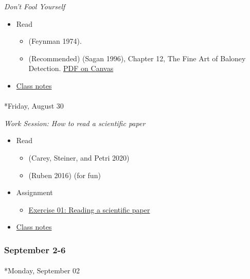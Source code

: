 \documentclass[
  letterpaper,
  DIV=11,
  numbers=noendperiod]{scrartcl}
\makeatletter
\let\oldparagraph\paragraph
\renewcommand{\paragraph}{
    \@ifstar
      \xxxParagraphStar
      \xxxParagraphNoStar
  }
\newcommand{\xxxParagraphStar}[1]{\oldparagraph*{#1}\mbox{}}
\newcommand{\xxxParagraphNoStar}[1]{\oldparagraph{#1}\mbox{}}
\providecommand{\tightlist}{%
  \setlength{\itemsep}{0pt}\setlength{\parskip}{0pt}}\usepackage{longtable,booktabs,array}
\makeatother
\begin{document}
\emph{Don't Fool Yourself}

\begin{itemize}
\tightlist
\item
  Read

  \begin{itemize}
  \tightlist
  \item
    (Feynman 1974).
  \item
    (Recommended) (Sagan 1996), Chapter 12, The Fine Art of Baloney
    Detection.
    \href{https://psu.instructure.com/courses/2350148/files/folder/readings?preview=165170710}{PDF
    on Canvas}
  \end{itemize}
\item
  \href{notes/wk01-2024-08-28-no-foolin.qmd}{Class notes}
\end{itemize}

\paragraph*{Friday, August 30}\label{friday-august-30}

\emph{Work Session: How to read a scientific paper}

\begin{itemize}
\tightlist
\item
  Read

  \begin{itemize}
  \tightlist
  \item
    (Carey, Steiner, and Petri 2020)
  \item
    (Ruben 2016) (for fun)
  \end{itemize}
\item
  {Assignment}

  \begin{itemize}
  \tightlist
  \item
    \href{exercises/ex01-read-a-scientific-paper.qmd}{Exercise 01:
    Reading a scientific paper}
  \end{itemize}
\item
  \href{notes/wk01-2024-08-30-how-to-read.qmd}{Class notes}
\end{itemize}

\subsubsection*{September 2-6}\label{week-02}

\paragraph*{Monday, September 02}\label{monday-september-02}
\end{document}
